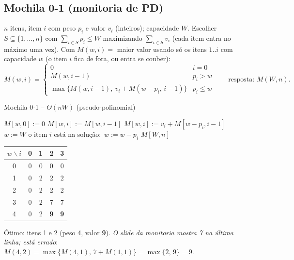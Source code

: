 \subsection{Mochila 0-1 (monitoria de PD)}\label{sec:mochila}
$n$ itens, item $i$ com peso $p_i$ e valor $v_i$ (inteiros); capacidade $W$. Escolher $S\subseteq\{1,\dots,n\}$ com $\sum_{i\in S}p_i\le W$ maximizando $\sum_{i\in S}v_i$ (cada item entra no máximo uma vez).
Com $M(w,i)=$ maior valor usando só os itens $1..i$ com capacidade $w$ (o item $i$ fica de fora, ou entra se couber):
\[
M(w,i)=\begin{cases}0 & i=0\\ M(w,i-1) & p_i>w\\ \max\{M(w,i-1),\ v_i+M(w-p_i,\,i-1)\} & p_i\le w\end{cases}\qquad\text{resposta: }M(W,n).
\]
\begin{pseudo}{Mochila 0-1 -- $\Theta(nW)$ (pseudo-polinomial)}
\begin{algorithmic}
   \State $M[w,0]:=0$ \EndFor
      \State $M[w,i]:=M[w,i-1]$
       \State $M[w,i]:=v_i+M[w-p_i,i-1]$ \EndIf
    \EndFor
  \EndFor
  \State $w:=W$ 
     \State o item $i$ está na solução;\ $w:=w-p_i$ \EndIf
  \EndFor
  \State \Return $M[W,n]$
\EndFunction
\end{algorithmic}
\end{pseudo}
\begin{exemplo}[Monitoria: $W=4$; itens $(p,v)=(1,2),(3,7),(2,1)$ --- conferido]\leavevmode
\begin{center}\small
\begin{tabular}{c|cccc}
$w\backslash i$ & 0 & 1 & 2 & 3\\ \hline
0 & 0 & 0 & 0 & 0\\
1 & 0 & 2 & 2 & 2\\
2 & 0 & 2 & 2 & 2\\
3 & 0 & 2 & 7 & 7\\
4 & 0 & 2 & \textbf{9} & \textbf{9}
\end{tabular}
\end{center}
Ótimo: itens 1 e 2 (peso 4, valor \textbf{9}). \emph{O slide da monitoria mostra 7 na última linha; está errado}: $M(4,2)=\max\{M(4,1),\,7+M(1,1)\}=\max\{2,\,9\}=9$.
\end{exemplo}
